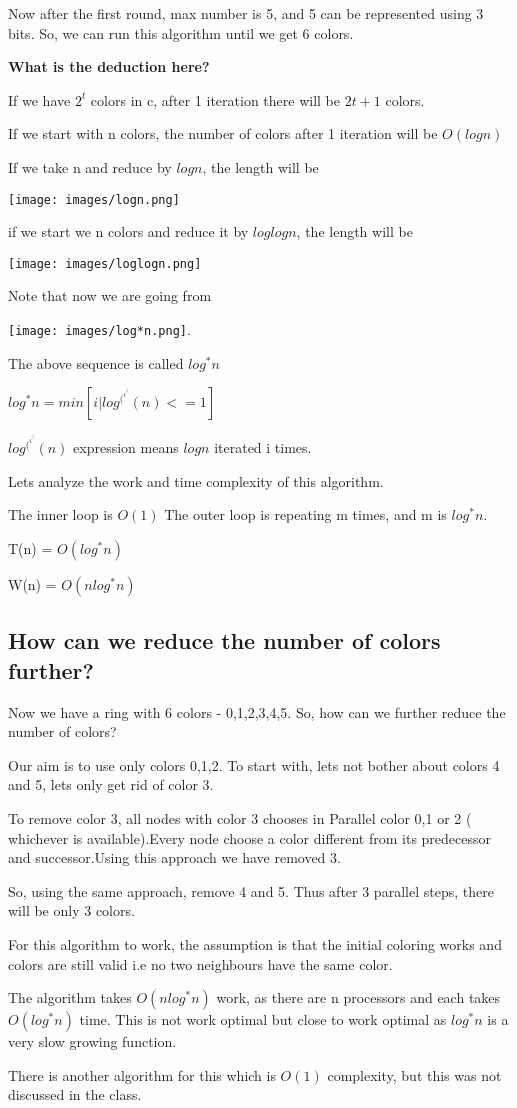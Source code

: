\documentclass[twoside]{article}
\begin{document}
Now after the first round, max number is 5, and 5 can be represented using 3 bits. So, we can run this algorithm until we get 6 colors.

\textbf{What is the deduction here?}


If we have $2^t$ colors in c, after 1 iteration there will be $2t+1$ colors.

If we start with n colors, the number of colors after 1 iteration will be $O(logn)$

If we take n and reduce by $logn$, the length will be

\texttt{[image: images/logn.png]}

if we start we n colors and reduce it by $loglogn$, the length will be 

\texttt{[image: images/loglogn.png]}

Note that now we are going from 

\texttt{[image: images/log*n.png]}.

The above sequence is called $log^*n$

$log^*n =  min [ i | log^(^i^)(n) <= 1 ]$

$log^(^i^)(n)$ expression means $logn$ iterated i times.

Lets analyze the work and time complexity of this algorithm.

The inner loop is $O(1)$
The outer loop is repeating m times, and m is $log^*n$.

T(n) = $O(log^*n)$

W(n) = $O(nlog^*n)$

\subsection{How can we reduce the number of colors further?}

Now we have a ring with 6 colors - 0,1,2,3,4,5. So, how can we further reduce the number of colors?

Our aim is to use only colors 0,1,2. To start with, lets not bother about colors 4 and 5, lets only get rid of color 3.

To remove color 3, all nodes with color 3 chooses in Parallel color 0,1 or 2 ( whichever is available).Every node choose a color different from its predecessor and successor.Using this approach we have removed 3. 

So, using the same approach, remove 4 and 5. Thus after 3 parallel steps, there will be only 3 colors.

For this algorithm to work, the assumption is that the initial coloring works and colors are still valid i.e no two neighbours have the same color.

The algorithm takes $O(nlog^*n)$ work, as there are n processors and each takes $O(log^*n)$ time. This is not work optimal but close to work optimal as $log^*n$ is a very slow growing function.

There is another algorithm for this which is $O(1)$ complexity, but this was not discussed in the class.
\end{document}

